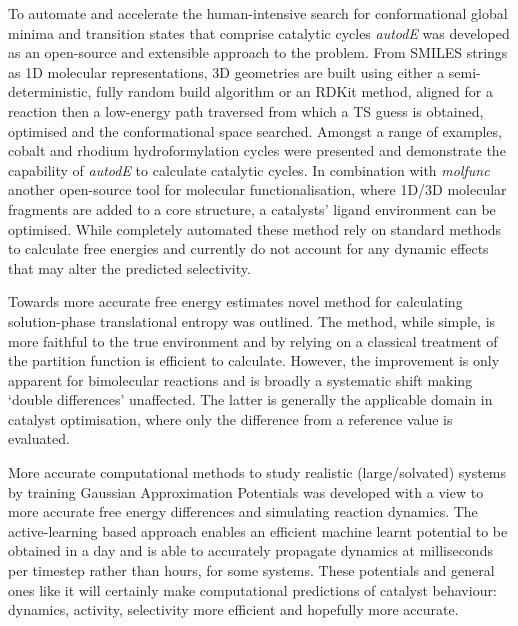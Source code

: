 \documentclass[../main.tex]{subfiles}
\begin{document}
To automate and accelerate the human-intensive search for conformational global minima and transition states that comprise catalytic cycles \emph{autodE} was developed as an open-source and extensible approach to the problem. From SMILES strings as 1D molecular representations, 3D geometries are built using either a semi-deterministic, fully random build algorithm or an RDKit\cite{Landrum2019} method, aligned for a reaction then a low-energy path traversed from which a TS guess is obtained, optimised and the conformational space searched. Amongst a range of examples, cobalt and rhodium hydroformylation cycles were presented and demonstrate the capability of \emph{autodE} to calculate catalytic cycles. In combination with \emph{molfunc} another open-source tool for molecular functionalisation, where 1D/3D molecular fragments are added to a core structure, a catalysts' ligand environment can be optimised. While completely automated these method rely on standard methods to calculate free energies and currently do not account for any dynamic effects that may alter the predicted selectivity. 


Towards more accurate free energy estimates novel method for calculating solution-phase translational entropy was outlined. The method, while simple, is more faithful to the true environment and by relying on a classical treatment of the partition function is efficient to calculate. However, the improvement is only apparent for bimolecular reactions and is broadly a systematic shift making `double differences' unaffected. The latter is generally the applicable domain in catalyst optimisation, where only the difference from a reference value is evaluated.

More accurate computational methods to study realistic (large/solvated) systems by training Gaussian Approximation Potentials was developed with a view to more accurate free energy differences and simulating reaction dynamics. The active-learning based approach enables an efficient machine learnt potential to be obtained in a day and is able to accurately propagate dynamics at milliseconds per timestep rather than hours, for some systems. These potentials and general ones like it will certainly make computational predictions of catalyst behaviour: dynamics, activity, selectivity more efficient and hopefully more accurate.
\end{document}
